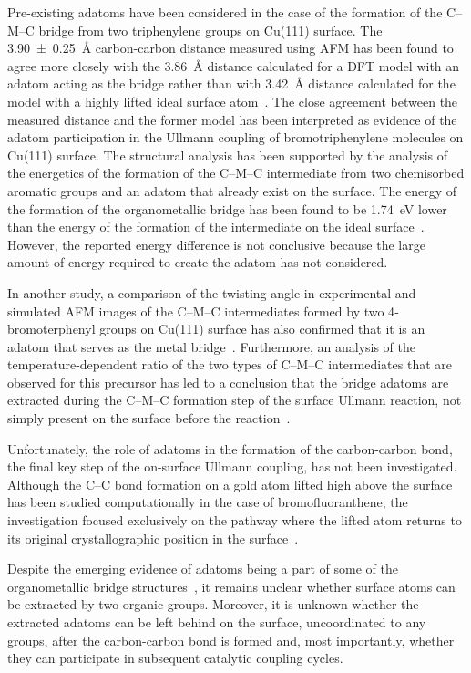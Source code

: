 \documentclass[aps,prb,amsmath,amssymb,11pt]{revtex4-1}
\begin{document}
Pre-existing adatoms have been considered in the case of the formation of the C--M--C bridge from two triphenylene groups on Cu(111) surface. 
The \SI{3.90\pm 0.25}{\angstrom} carbon-carbon distance measured using AFM has been found to agree more closely with the \SI{3.86}{\angstrom} distance calculated for a DFT model with an adatom acting as the bridge rather than with \SI{3.42}{\angstrom} distance calculated for the model with a highly lifted ideal surface atom~\cite{acsnano2017}. 
The close agreement between the measured distance and the former model has been interpreted as evidence of the adatom participation in the Ullmann coupling of bromotriphenylene molecules on Cu(111) surface. 
%
The structural analysis has been supported by the analysis of the energetics of the formation of the C--M--C intermediate from two chemisorbed aromatic groups and an adatom that already exist on the surface. The energy of the formation of the organometallic bridge has been found to be \SI{1.74}{\electronvolt} lower than the energy of the formation of the intermediate on the ideal surface~\cite{acsnano2017}. However, the reported energy difference is not conclusive because the large amount of energy required to create the adatom has not considered.

In another study, a comparison of the twisting angle in experimental and simulated AFM images of the C--M--C intermediates formed by two 4‐bromoterphenyl groups on Cu(111) surface 
has also confirmed that it is an adatom that serves as the metal bridge~\cite{acsnano2019}. Furthermore, an analysis of the temperature-dependent ratio of the two types of C--M--C intermediates that are observed for this precursor has led to a conclusion that the bridge adatoms are extracted during the C--M--C formation step of the surface Ullmann reaction, not simply present on the surface before the reaction~\cite{acsnano2019}. 

Unfortunately, the role of adatoms in the formation of the carbon-carbon bond, the final key step of the on-surface Ullmann coupling, has not been investigated. Although the C--C bond formation on a gold atom lifted high above the surface has been studied computationally in the case of bromofluoranthene,
the investigation focused exclusively on the pathway where the lifted atom returns to its original crystallographic position in the surface~\cite{jpcc2018}. 

Despite the emerging evidence of adatoms being a part of some of the organometallic bridge structures~\cite{acsnano2017, acsnano2019}, it remains unclear whether surface atoms can be extracted by two organic groups. Moreover, it is unknown whether the extracted adatoms can be left behind on the surface, uncoordinated to any groups, after the carbon-carbon bond is formed and, most importantly, whether they can participate in subsequent catalytic coupling cycles.
\end{document}
